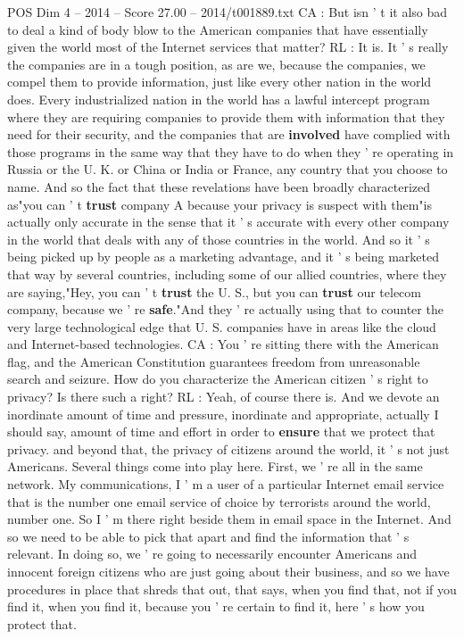 \begin{textsample}{POS Dim 4 – 2014 – Score 27.00 – 2014/t001889.txt}
CA : But isn ' t it also bad to deal a kind of body blow to the American companies that have essentially given the world most of the Internet services that matter?
RL : It is.
It ' s really the companies are in a tough position, as are we, because the companies, we compel them to provide information, just like every other nation in the world does.
Every industrialized nation in the world has a lawful intercept program where they are requiring companies to provide them with information that they need for their security, and the companies that are \textbf{involved} have complied with those programs in the same way that they have to do when they ' re operating in Russia or the U.
K. or China or India or France, any country that you choose to name.
And so the fact that these revelations have been broadly characterized as"you can ' t \textbf{trust} company A because your privacy is suspect with them"is actually only accurate in the sense that it ' s accurate with every other company in the world that deals with any of those countries in the world.
And so it ' s being picked up by people as a marketing advantage, and it ' s being marketed that way by several countries, including some of our allied countries, where they are saying,"Hey, you can ' t \textbf{trust} the U.
S., but you can \textbf{trust} our telecom company, because we ' re \textbf{safe}."And they ' re actually using that to counter the very large technological edge that U.
S. companies have in areas like the cloud and Internet-based technologies.
CA : You ' re sitting there with the American flag, and the American Constitution guarantees freedom from unreasonable search and seizure.
How do you characterize the American citizen ' s right to privacy?
Is there such a right?
RL : Yeah, of course there is.
And we devote an inordinate amount of time and pressure, inordinate and appropriate, actually I should say, amount of time and effort in order to \textbf{ensure} that we protect that privacy. and beyond that, the privacy of citizens around the world, it ' s not just Americans.
Several things come into play here.
First, we ' re all in the same network.
My communications, I ' m a user of a particular Internet email service that is the number one email service of choice by terrorists around the world, number one.
So I ' m there right beside them in email space in the Internet.
And so we need to be able to pick that apart and find the information that ' s relevant.
In doing so, we ' re going to necessarily encounter Americans and innocent foreign citizens who are just going about their business, and so we have procedures in place that shreds that out, that says, when you find that, not if you find it, when you find it, because you ' re certain to find it, here ' s how you protect that.

\end{textsample}
